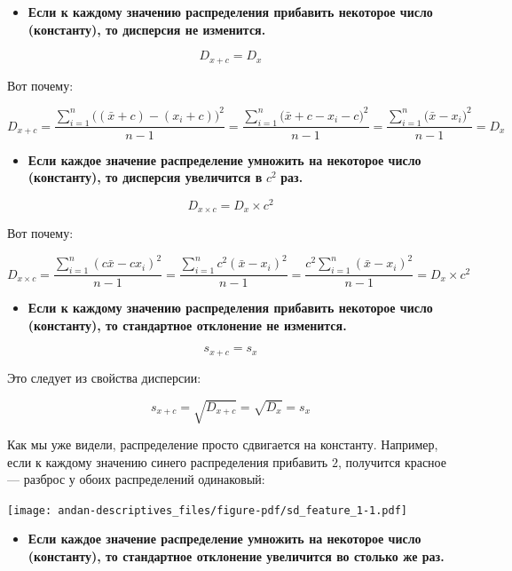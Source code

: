 \documentclass[
  letterpaper,
  DIV=11,
  numbers=noendperiod]{scrreprt}
\providecommand{\tightlist}{%
  \setlength{\itemsep}{0pt}\setlength{\parskip}{0pt}}\usepackage{longtable,booktabs,array}
\theoremstyle{definition}
\theoremstyle{remark}
\begin{document}
\begin{itemize}
\tightlist
\item
  \textbf{Если к каждому значению распределения прибавить некоторое
  число (константу), то дисперсия не изменится.}
\end{itemize}

\[
D_{x+c} = D_{x}
\]

Вот почему:

\[
D_{x+c} = \frac{\sum_{i=1}^n \big((\bar x + c) - (x_i + c)\big)^2}{n-1} = \frac{\sum_{i=1}^n \big(\bar x + c - x_i - c\big)^2}{n-1} = \frac{\sum_{i=1}^n \big(\bar x - x_i\big)^2}{n-1} = D_x
\]

\begin{itemize}
\tightlist
\item
  \textbf{Если каждое значение распределение умножить на некоторое число
  (константу), то дисперсия увеличится в} \(c^2\) \textbf{раз.}
\end{itemize}

\[
D_{x \times c} = D_{x} \times c^2
\]

Вот почему:

\[
D_{x \times c} = \frac{\sum_{i=1}^n (c\bar x - cx_i)^2}{n-1} = \frac{\sum_{i=1}^n c^2(\bar x - x_i)^2}{n-1} = \frac{c^2 \sum_{i=1}^n (\bar x - x_i)^2}{n-1} = D_x \times c^2
\]

\begin{itemize}
\tightlist
\item
  \textbf{Если к каждому значению распределения прибавить некоторое
  число (константу), то стандартное отклонение не изменится.}
\end{itemize}

\[
s_{x+c} = s_x
\]

Это следует из свойства дисперсии:

\[
s_{x+c} = \sqrt{D_{x+c}} = \sqrt{D_x} = s_x
\]

Как мы уже видели, распределение просто сдвигается на константу.
Например, если к каждому значению синего распределения прибавить \(2\),
получится красное --- разброс у обоих распределений одинаковый:

\texttt{[image: andan-descriptives\_files/figure-pdf/sd\_feature\_1-1.pdf]}

\begin{itemize}
\tightlist
\item
  \textbf{Если каждое значение распределение умножить на некоторое число
  (константу), то стандартное отклонение увеличится во столько же раз.}
\end{itemize}
\end{document}
